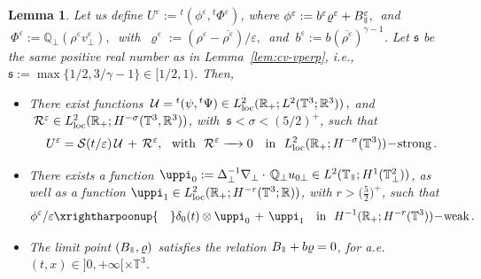 \documentclass[11pt,reqno]{amsart}
\newtheorem{lemma}{Lemma}
\def \R{{\mathbb{R}}}
\def \Q{{\mathbb{Q}}}
\def \T{{\mathbb{T}}}
\newcommand{\myparallel}{{\mkern3mu\vphantom{\perp}\vrule depth 0pt\mkern2mu\vrule depth 0pt\mkern3mu}}
\begin{document}
\begin{lemma}
\label{lem:UG}
Let us define  $U^\varepsilon:={}^t(\phi^\varepsilon, {}^t\Phi^\varepsilon)$, where $\phi^\varepsilon := b^\varepsilon \varrho^\varepsilon + B_\myparallel^\varepsilon,\,$ and $\ \Phi^\varepsilon:=\Q_\perp(\rho^\varepsilon v_\perp^\varepsilon),\, $ with $\ \varrho^\varepsilon:= (\rho^\varepsilon-\overline{\rho^\varepsilon})/\varepsilon,\,$  and $\ b^\varepsilon:= b (\overline{\rho^\varepsilon})^{\gamma-1}$. Let $\mathfrak s$ be the same positive real number as in Lemma~\ref {lem:cv-vperp}, i.e., $\mathfrak s := \max\{1/2, 3/\gamma-1\} \in [1/2,1)$. Then, 
  \begin{itemize}
  \item[1.] There exist functions $\, \mathcal U={}^t(\psi, {}^t\Psi) \in L_{\rm loc}^2(\R_+;L^2(\T^3;\R^3))\,,$  and
    $\ \mathcal R^\varepsilon \in L_{\rm loc}^2(\R_+;H^{-\sigma}(\T^3,\R^3))$, with  $\ \mathfrak s <\sigma< (5/2)^+ $, such that
    \begin{equation}
      \label{eqn:GPR}
      U^\varepsilon= \mathcal S (t/\varepsilon)\, \mathcal U
      \, + \, \mathcal R^\varepsilon,
      \ \mbox{ with} \ \ \mathcal R^\varepsilon  \xrightarrow{\quad} 0 \ \
      \mbox{ \rm in } \  L_{\rm loc}^2(\R_+; H^{-\sigma}(\T^3))\!-\!\mbox{\rm strong}\,.
    \end{equation}
  \item[2.] There exists a function $\uppi_0 := \Delta_\perp^{-1} \nabla_\perp\cdot\, \Q_\perp u_{0 \perp} \in L^2(\T_\myparallel; H^1(\T_\perp^2))$, as well as a function $\uppi_1 \in  L_{\rm loc}^2(\R_+;H^{-r}(\T^3;\R))$, with $r> \big(\tfrac52 \big)^+$, such that
    \begin{equation}
      \label{eqn:existpi1}
            {\phi^\varepsilon}/{\varepsilon} \xrightharpoonup{\quad}   \delta_{0}(t) \otimes \uppi_0 \, + \,  \uppi_1 
            \ \ \mbox{ \rm in } \  H^{-1}(\R_+; H^{-r}(\T^3))\!-\!\mbox{\rm weak}\,.
    \end{equation}
  \item[3.] The limit point $(B_\myparallel, \varrho)$ satisfies the relation  $B_\myparallel + b\varrho =0$, for a.e. $(t,x) \in ]0,+\infty[ \times \T^3$.
  \end{itemize} 
\end{lemma}
\end{document}
